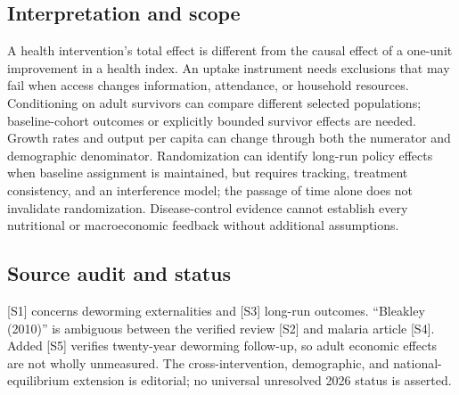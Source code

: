 \documentclass[11pt,a4paper]{article}
\begin{document}
\subsection*{Interpretation and scope}
A health intervention's total effect is different from the causal effect of a one-unit improvement in a health index. An uptake instrument needs exclusions that may fail when access changes information, attendance, or household resources. Conditioning on adult survivors can compare different selected populations; baseline-cohort outcomes or explicitly bounded survivor effects are needed. Growth rates and output per capita can change through both the numerator and demographic denominator. Randomization can identify long-run policy effects when baseline assignment is maintained, but requires tracking, treatment consistency, and an interference model; the passage of time alone does not invalidate randomization. Disease-control evidence cannot establish every nutritional or macroeconomic feedback without additional assumptions.
\subsection*{Source audit and status}
[S1] concerns deworming externalities and [S3] long-run outcomes. ``Bleakley (2010)'' is ambiguous between the verified review [S2] and malaria article [S4]. Added [S5] verifies twenty-year deworming follow-up, so adult economic effects are not wholly unmeasured. The cross-intervention, demographic, and national-equilibrium extension is editorial; no universal unresolved 2026 status is asserted.
\end{document}

